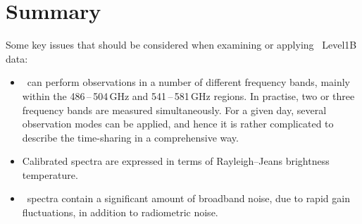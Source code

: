 
    




\chapter{Summary}


Some key issues that should be considered when examining or applying \smr\
Level1B data:
\begin{itemize}

\item \smr\ can perform observations in a number of different frequency
bands, mainly within the 486\,--\,504\,GHz and 541\,--\,581\,GHz regions.
In practise, two or three frequency bands are measured simultaneously.
For a given day, several observation modes can be applied, and hence
it is rather complicated to describe the time-sharing in a 
comprehensive way.
 

\item Calibrated spectra are expressed in terms of Rayleigh--Jeans brightness temperature.

\item \smr\ spectra contain a significant amount of broadband noise, 
due to rapid gain fluctuations, in addition to radiometric noise.


\end{itemize}

